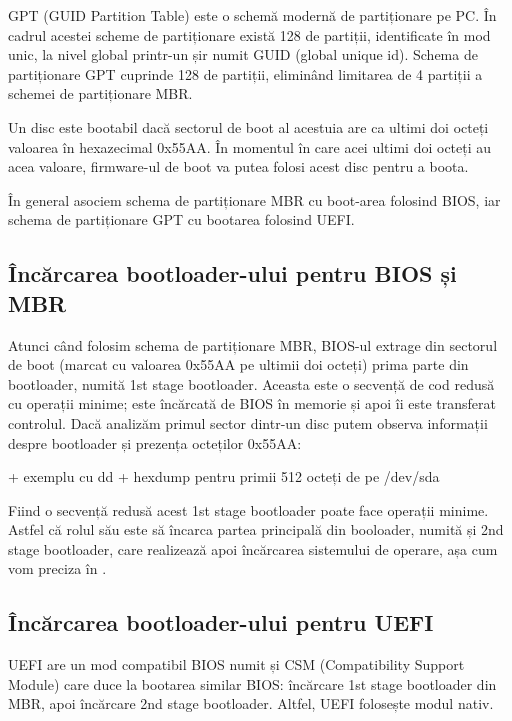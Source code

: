 GPT (GUID Partition Table) este o schemă modernă de partiționare pe PC. În
cadrul acestei scheme de partiționare există 128 de partiții, identificate în
mod unic, la nivel global printr-un șir numit GUID (global unique id). Schema de
partiționare GPT cuprinde 128 de partiții, eliminând limitarea de 4 partiții a
schemei de partiționare MBR.

Un disc este bootabil dacă sectorul de boot al acestuia are ca ultimi doi octeți
valoarea în hexazecimal 0x55AA. În momentul în care acei ultimi doi octeți au
acea valoare, firmware-ul de boot va putea folosi acest disc pentru a boota.

În general asociem schema de partiționare MBR cu boot-area folosind BIOS, iar
schema de partiționare GPT cu bootarea folosind UEFI.

\subsection{Încărcarea bootloader-ului pentru BIOS și MBR}
\label{sec:boot-bootdev-bootmbr}

Atunci când folosim schema de partiționare MBR, BIOS-ul extrage din sectorul de
boot (marcat cu valoarea 0x55AA pe ultimii doi octeți) prima parte din
bootloader, numită 1st stage bootloader. Aceasta este o secvență de cod redusă
cu operații minime; este încărcată de BIOS în memorie și apoi îi este transferat
controlul. Dacă analizăm primul sector dintr-un disc putem observa informații
despre bootloader și prezența octeților 0x55AA:

+ exemplu cu dd + hexdump pentru primii 512 octeți de pe /dev/sda

Fiind o secvență redusă acest 1st stage bootloader poate face operații minime.
Astfel că rolul său este să încarca partea principală din booloader, numită și
2nd stage bootloader, care realizează apoi încărcarea sistemului de operare, așa
cum vom preciza în .

\subsection{Încărcarea bootloader-ului pentru UEFI}
\label{sec:boot-bootdev-bootuefi}

UEFI are un mod compatibil BIOS numit și CSM (Compatibility Support Module) care
duce la bootarea similar BIOS: încărcare 1st stage bootloader din MBR, apoi
încărcare 2nd stage bootloader. Altfel, UEFI folosește modul nativ.

